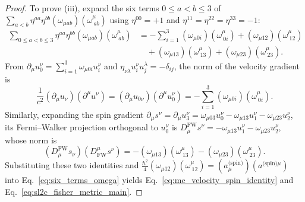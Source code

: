 \documentclass[11pt, a4paper]{article}
\theoremstyle{definition}
\begin{document}
\begin{proof}
To prove (iii), expand the six terms $0 \le a < b \le 3$ of $\sum_{a<b}\eta^{aa}\eta^{bb}(\omega_{\mu ab})(\omega^\mu_{\ ab})$ using $\eta^{00} = +1$ and $\eta^{11} = \eta^{22} = \eta^{33} = -1$:
\begin{equation}
\label{eq:six_terms_omega}
\begin{aligned}
\sum_{0 \le a < b \le 3} \eta^{aa}\eta^{bb} (\omega_{\mu ab})(\omega^\mu_{\ ab}) &= -\sum_{i=1}^3 (\omega_{\mu 0i})(\omega^\mu_{\ 0i}) + (\omega_{\mu 12})(\omega^\mu_{\ 12}) \\
&\quad + (\omega_{\mu 13})(\omega^\mu_{\ 13}) + (\omega_{\mu 23})(\omega^\mu_{\ 23}).
\end{aligned}
\end{equation}
From $\partial_\mu u_0^\nu = \sum_{i=1}^3 \omega_{\mu 0i} u_i^\nu$ and $\eta_{\nu\lambda} u_i^\nu u_j^\lambda = -\delta_{ij}$, the norm of the velocity gradient is
\begin{equation}
\frac{1}{c^2}(\partial_\mu u_\nu)(\partial^\mu u^\nu) = (\partial_\mu u_{0\nu})(\partial^\mu u_0^\nu) = -\sum_{i=1}^3 (\omega_{\mu 0i})(\omega^\mu_{\ 0i}).
\end{equation}
Similarly, expanding the spin gradient $\partial_\mu s^\nu = \partial_\mu u_3^\nu = \omega_{\mu 03} u_0^\nu - \omega_{\mu 13} u_1^\nu - \omega_{\mu 23} u_2^\nu$, its Fermi--Walker projection orthogonal to $u_0^\nu$ is $D_\mu^{\text{FW}} s^\nu = -\omega_{\mu 13} u_1^\nu - \omega_{\mu 23} u_2^\nu$, whose norm is
\begin{equation}
(D_\mu^{\text{FW}} s_\nu)(D_{\text{FW}}^\mu s^\nu) = -(\omega_{\mu 13})(\omega^\mu_{\ 13}) - (\omega_{\mu 23})(\omega^\mu_{\ 23}).
\end{equation}
Substituting these two identities and $\frac{\hbar^2}{4}(\omega_{\mu 12})(\omega^\mu_{\ 12}) = (a_\mu^{\text{(spin)}})(a^{\text{(spin)}\mu})$ into Eq.~\eqref{eq:six_terms_omega} yields Eq.~\eqref{eq:mc_velocity_spin_identity} and Eq.~\eqref{eq:sl2c_fisher_metric_main}.
\end{proof}
\end{document}

